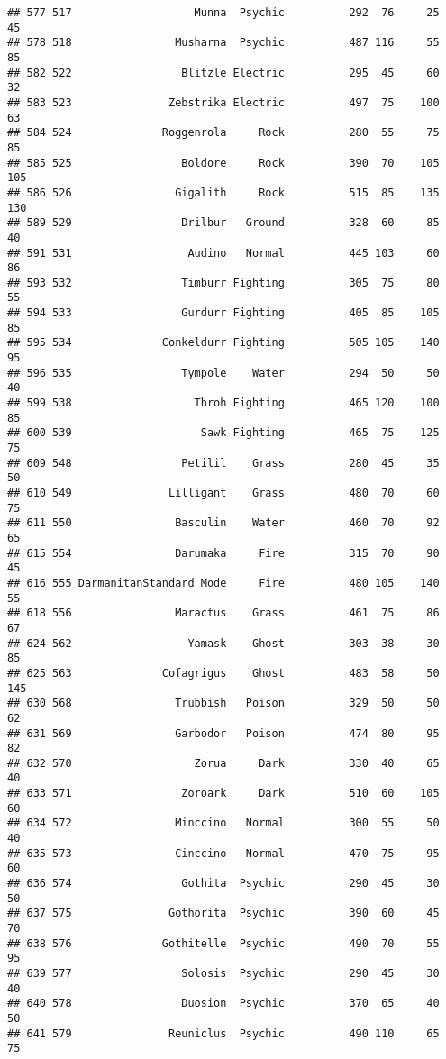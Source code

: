 \documentclass[
]{article}
\begin{document}
\begin{verbatim}
## 577 517                   Munna  Psychic          292  76     25      45
## 578 518                Musharna  Psychic          487 116     55      85
## 582 522                 Blitzle Electric          295  45     60      32
## 583 523               Zebstrika Electric          497  75    100      63
## 584 524              Roggenrola     Rock          280  55     75      85
## 585 525                 Boldore     Rock          390  70    105     105
## 586 526                Gigalith     Rock          515  85    135     130
## 589 529                 Drilbur   Ground          328  60     85      40
## 591 531                  Audino   Normal          445 103     60      86
## 593 532                 Timburr Fighting          305  75     80      55
## 594 533                 Gurdurr Fighting          405  85    105      85
## 595 534              Conkeldurr Fighting          505 105    140      95
## 596 535                 Tympole    Water          294  50     50      40
## 599 538                   Throh Fighting          465 120    100      85
## 600 539                    Sawk Fighting          465  75    125      75
## 609 548                 Petilil    Grass          280  45     35      50
## 610 549               Lilligant    Grass          480  70     60      75
## 611 550                Basculin    Water          460  70     92      65
## 615 554                Darumaka     Fire          315  70     90      45
## 616 555 DarmanitanStandard Mode     Fire          480 105    140      55
## 618 556                Maractus    Grass          461  75     86      67
## 624 562                  Yamask    Ghost          303  38     30      85
## 625 563              Cofagrigus    Ghost          483  58     50     145
## 630 568                Trubbish   Poison          329  50     50      62
## 631 569                Garbodor   Poison          474  80     95      82
## 632 570                   Zorua     Dark          330  40     65      40
## 633 571                 Zoroark     Dark          510  60    105      60
## 634 572                Minccino   Normal          300  55     50      40
## 635 573                Cinccino   Normal          470  75     95      60
## 636 574                 Gothita  Psychic          290  45     30      50
## 637 575               Gothorita  Psychic          390  60     45      70
## 638 576              Gothitelle  Psychic          490  70     55      95
## 639 577                 Solosis  Psychic          290  45     30      40
## 640 578                 Duosion  Psychic          370  65     40      50
## 641 579               Reuniclus  Psychic          490 110     65      75

\end{verbatim}
\end{document}
